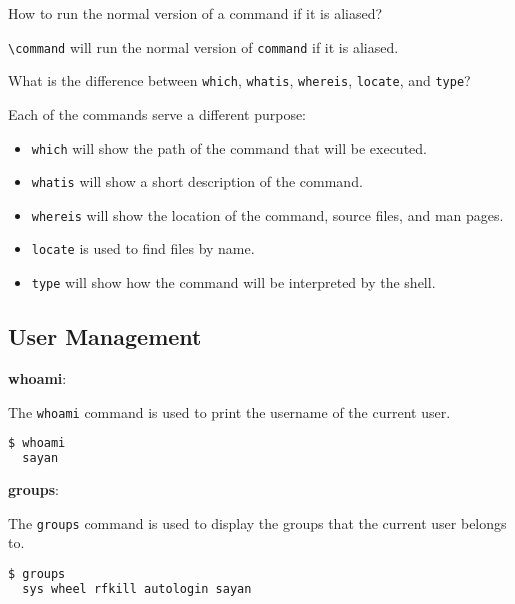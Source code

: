\begin{qs}
  How to run the normal version of a command if it is aliased?
\end{qs}

\begin{ans}
  \texttt{\textbackslash command} will run the normal version of \texttt{command} if it is aliased.
\end{ans}

\begin{qs}
  What is the difference between \texttt{which}, \texttt{whatis}, \texttt{whereis}, \texttt{locate}, and \texttt{type}?
\end{qs}

\begin{ans}
  Each of the commands serve a different purpose:
  \begin{itemize}
    \item \texttt{which} will show the path of the command that will be executed.
    \item \texttt{whatis} will show a short description of the command.
    \item \texttt{whereis} will show the location of the command, source files, and man pages.
    \item \texttt{locate} is used to find files by name.
    \item \texttt{type} will show how the command will be interpreted by the shell.
  \end{itemize}
\end{ans}


\subsection{User Management}

\textbf{whoami}:

The \texttt{whoami} command is used to print the username of the current user.

\begin{lstlisting}[language=bash]
  $ whoami
  sayan
\end{lstlisting}

\textbf{groups}:

The \texttt{groups} command is used to display the groups that the current user belongs to.

\begin{lstlisting}[language=bash]
  $ groups
  sys wheel rfkill autologin sayan
\end{lstlisting}


